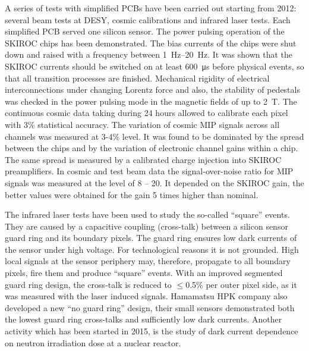 A series of tests with simplified PCBs have been carried out starting from
2012: several beam tests at DESY, cosmic calibrations and infrared laser
tests. Each simplified PCB served one silicon sensor. The power pulsing
operation of the SKIROC chips has been demonstrated. The bias currents of the
chips were shut down and raised with a frequency between \SIrange{1}{20}{Hz}. It was
shown that the SKIROC currents should be switched on at least \SI{600}{\micro \second}
before physical events, so that all transition processes are finished.
Mechanical rigidity of electrical interconnections under changing Lorentz
force and also, the stability of pedestals was checked in the power pulsing
mode in the magnetic fields of up to \SI{2}{T}. The continuous cosmic data taking
during 24 hours allowed to calibrate each pixel with 3\% statistical accuracy.
The variation of cosmic MIP signals across all channels was measured at 3-4\%
level. It was found to be dominated by the spread between the chips and by
the variation of electronic channel gains within a chip. The same spread is
measured by a calibrated charge injection into SKIROC preamplifiers. In
cosmic and test beam data the signal-over-noise ratio for MIP signals was
measured at the level of 8 -- 20. It depended on the SKIROC gain, the better
values were obtained for the gain 5 times higher than nominal.

The infrared laser tests have been used to study the so-called ``square''
events. They are caused by a capacitive coupling (cross-talk) between a
silicon sensor guard ring and its boundary pixels. The guard ring ensures low
dark currents of the sensor under high voltage. For technological reasons it
is not grounded. High local signals at the sensor periphery may, therefore,
propagate to all boundary pixels, fire them and produce ``square''
events. With an improved segmented guard ring design, the cross-talk is
reduced to $\le$0.5\% per outer pixel side, as it was measured with the laser
induced signals. Hamamatsu HPK company also developed a new ``no guard ring''
design, their small sensors demonstrated both the lowest guard ring
cross-talks and sufficiently low dark currents. Another activity which has
been started in 2015, is the study of dark current dependence on neutron
irradiation dose at a nuclear reactor.

